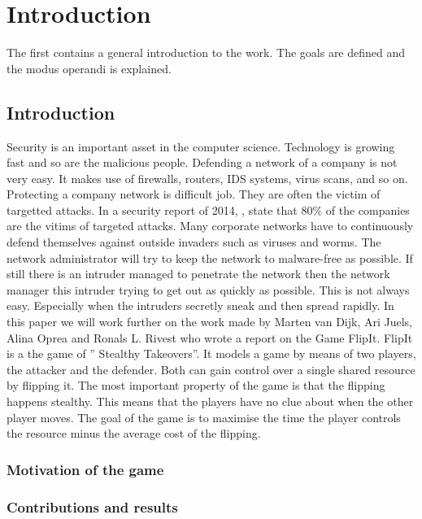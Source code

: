 \chapter{Introduction}
\label{cha:intro}
The first contains a general introduction to the work. The goals are
defined and the modus operandi is explained.
\section{Introduction}

Security is an important asset in the computer science. Technology is growing fast and so are the malicious people. Defending a network of a company is not very easy. It makes use of firewalls, routers, IDS systems, virus scans, and so on. Protecting a company network is difficult job. They are often the victim of targetted attacks. In a security report of 2014, , state that 80\% of the companies are the vitims of targeted attacks. 
Many corporate networks have to continuously defend themselves against outside invaders such as viruses and worms. The network administrator will try to keep the network to malware-free as possible. If still there is an intruder managed to penetrate the network then the network manager this intruder trying to get out as quickly as possible. This is not always easy. Especially when the intruders secretly sneak and then spread rapidly.
In this paper we will work further on the work made by Marten van Dijk, Ari Juels, Alina Oprea and Ronals L. Rivest  who wrote a report on the Game FlipIt. FlipIt is a the game of '' Stealthy Takeovers''. It models a game by means of two players, the attacker and the defender. Both can gain control over a single shared resource by flipping it. The most important property of the game is that the flipping happens stealthy. This means that the players have no clue about when the other player moves. The goal of the game is to maximise the time the player controls the resource minus the average cost of the flipping. 

\subsection{Motivation of the game}
\subsection{Contributions and results}
